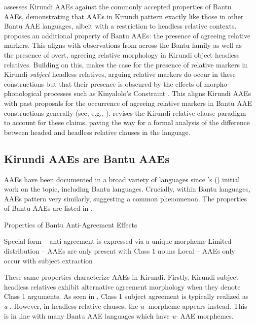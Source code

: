 \documentclass[output=paper,colorlinks,citecolor=brown
]{langscibook}
\begin{document}
 assesses Kirundi AAEs against the commonly accepted properties of Bantu AAEs, demonstrating that AAEs in Kirundi pattern exactly like those in other Bantu AAE languages, albeit with a restriction to headless relative contexts.  proposes an additional property of Bantu AAEs: the presence of agreeing relative markers. This aligns with observations from across the Bantu family as well as the presence of overt, agreeing relative morphology in Kirundi object headless relatives. Building on this,  makes the case for the presence of relative markers in Kirundi \emph{subject} headless relatives, arguing relative markers do occur in these constructions but that their presence is obscured by the effects of morpho-phonological processes such as Kinyalolo's Constraint \citep{Kinyalolo:1991}. This aligns Kirundi AAEs with past proposals for the occurrence of agreeing relative markers in Bantu AAE constructions generally (see, e.g.,  \citealt{BHenderson:2013}).  revises the Kirundi relative clause paradigm to account for these claims, paving the way for a formal analysis of the difference between headed and headless relative clauses in the language.



\subsection{Kirundi AAEs are Bantu AAEs} \label{sec:myers:bantuAAEs}

AAEs have been documented in a broad variety of languages since \citeauthor{Ouhalla:1993}'s (\citeyear{Ouhalla:1993}) initial work on the topic, including Bantu languages. Crucially, within Bantu languages, AAEs pattern very similarly, suggesting a common phenomenon. The properties of Bantu AAEs are listed in . 


\ea Properties of Bantu Anti-Agreement Effects \label{ex:myers:list}
\begin{xlist}

\ex Special form -- anti-agreement is expressed via a unique morpheme
\ex Limited distribution -- AAEs are only present with Class 1 nouns
\ex Local -- AAEs only occur with subject extraction
\end{xlist}
\z

These same properties characterize AAEs in Kirundi. Firstly, Kirundi subject headless relatives exhibit alternative agreement morphology when they denote Class 1 arguments. As seen in , Class 1 subject agreement is typically realized as \emph{a}-. However, in headless relative clauses, the \emph{u}- morpheme appears instead. This is in line with many Bantu AAE languages which have \emph{u}- AAE morphemes.
\end{document}
